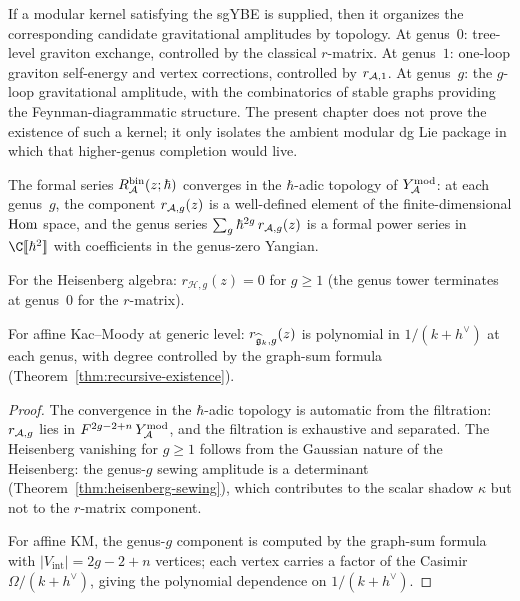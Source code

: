 \begin{remark}
\label{rem:thqg-V-sgybe-scattering}
If a modular kernel satisfying the sgYBE is supplied, then it
organizes the corresponding candidate gravitational amplitudes by
topology. At genus~$0$: tree-level graviton exchange, controlled by
the classical $r$-matrix. At genus~$1$: one-loop graviton
self-energy and vertex corrections, controlled by $r_{\mathcal{A},1}$.
At genus~$g$: the $g$-loop gravitational amplitude, with the
combinatorics of stable graphs providing the Feynman-diagrammatic
structure. The present chapter does not prove the existence of such a
kernel; it only isolates the ambient modular dg Lie package in which
that higher-genus completion would live.
\end{remark}

\begin{proposition}
\label{prop:thqg-V-pro-mc-convergence}
The formal series $R^{\mathrm{bin}}_{\mathcal{A}}(z;\hbar)$ converges in
the $\hbar$-adic topology of $Y^{\mathrm{mod}}_{\mathcal{A}}$: at each genus~$g$,
the component $r_{\mathcal{A},g}(z)$ is a well-defined element of the
finite-dimensional $\operatorname{Hom}$ space, and the genus series
$\sum_g \hbar^{2g}\,r_{\mathcal{A},g}(z)$ is a formal power series in
$\C[\![\hbar^2]\!]$ with coefficients in the genus-zero Yangian.

For the Heisenberg algebra: $r_{\mathcal{H},g}(z) = 0$ for
$g \geq 1$ \textup{(}the genus tower terminates at genus~$0$
for the $r$-matrix\textup{)}.

For affine Kac--Moody at generic level: $r_{\widehat{\mathfrak{g}}_k,g}(z)$
is polynomial in $1/(k+h^\vee)$ at each genus, with degree
controlled by the graph-sum formula
\textup{(}Theorem~\textup{\ref{thm:recursive-existence})}.
\end{proposition}

\begin{proof}
The convergence in the $\hbar$-adic topology is automatic from the
filtration: $r_{\mathcal{A},g}$ lies in $F^{2g-2+n}\,Y^{\mathrm{mod}}_{\mathcal{A}}$, and the
filtration is exhaustive and separated. The Heisenberg vanishing
for $g \geq 1$ follows from the Gaussian nature of the Heisenberg:
the genus-$g$ sewing amplitude is a determinant
(Theorem~\ref{thm:heisenberg-sewing}), which contributes to the
scalar shadow $\kappa$ but not to the $r$-matrix component.

For affine KM, the genus-$g$ component is computed by the graph-sum
formula with $|V_{\mathrm{int}}| = 2g - 2 + n$ vertices; each
vertex carries a factor of the Casimir $\Omega/(k+h^\vee)$, giving
the polynomial dependence on $1/(k+h^\vee)$.
\end{proof}


